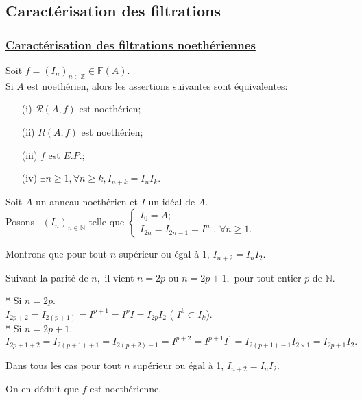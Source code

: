 \subsection{Caractérisation des filtrations}
\subsubsection{ \underline{Caractérisation des filtrations noethériennes}} 
\begin{maproposition}
	Soit $f=(I_{n})_{n \in \mathbb{Z}}\in \mathbb{F}(A).$ \\ Si $A$ est noethérien, alors les assertions suivantes sont équivalentes:
	\begin{enumerate}
		\item[(i)] $\mathcal{R}(A,f)$ est noethérien;
		\item[(ii)] $R(A,f)$ est noethérien;
		\item[(iii)] $f$ est $E.P.$;
		\item[(iv)] $\exists  n \geqslant 1,\forall n \geqslant k, I_{n+k} = I_nI_k$.
	\end{enumerate}
\end{maproposition}
\begin{monexemple}
	Soit $A$ un anneau noethérien et $I$ un idéal de $A$.\\
	Posons \ $(I_{n})_{n\in \mathbb{N}}$ telle que $\left\{ 
	\begin{array}{c}
		I_{0}=A ;\\ 
		I_{2n}=I_{2n-1}=I^{n}\text{ , }\forall n\geq 1.
	\end{array}
	\right. $
	
	Montrons que pour tout $n$ supérieur ou égal à 1, $I_{n+2}=I_{n}I_{2}$.
	
	Suivant la parité de $n,$ il vient $n=2p$ ou $n=2p+1,$ pour tout entier $p$ de $\mathbb{N}.$
	
	* Si $n=2p$. \\
	$I_{2p+2}=I_{2(p+1)}=I^{p+1}=I^{p}I=I_{2p}I_{2}$ ( $I^{k}\subset I_{k}$). \\
	* Si $n=2p+1$. \\
	$I_{2p+1+2}=I_{2(p+1)+1}=I_{2(p+2)-1}=I^{p+2}=I^{p+1}I^{1}=I_{2(p+1)-1}I_{2\times 1}=I_{2p+1}I_{2}.$
	
	Dans tous les cas pour tout  $n$ supérieur ou égal à 1, $I_{n+2}=I_{n}I_{2}.$
	
	On en déduit que $f$ est noethérienne.
\end{monexemple}


